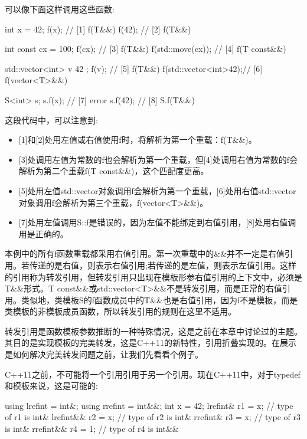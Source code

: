 可以像下面这样调用这些函数:

\begin{cpp}
int x = 42;
f(x); // [1] f(T&&)
f(42); // [2] f(T&&)

int const cx = 100;
f(cx); // [3] f(T&&)
f(std::move(cx)); // [4] f(T const&&)

std::vector<int> v{ 42 };
f(v); // [5] f(T&&)
f(std::vector<int>{42});// [6] f(vector<T>&&)

S<int> s;
s.f(x); // [7] error
s.f(42); // [8] S.f(T&&)
\end{cpp}

这段代码中，可以注意到:

\begin{itemize}
\item
{}[1]和[2]处用左值或右值使用f时，将解析为第一个重载：f(T\&\&)。

\item
{}[3]处调用左值为常数的f也会解析为第一个重载，但[4]处调用右值为常数的f会解析为第二个重载f(T const\&\&)，这个匹配度更高。

\item
{}[5]处用左值std::vector对象调用f会解析为第一个重载，[6]处用右值std::vector对象调用f会解析为第三个重载，f(vector<T>\&\&)。

\item
{}[7]处用左值调用S::f是错误的，因为左值不能绑定到右值引用，[8]处用右值调用是正确的。
\end{itemize}

本例中的所有f函数重载都采用右值引用。第一次重载中的\&\&并不一定是右值引用。若传递的是右值，则表示右值引用;若传递的是左值，则表示左值引用。这样的引用称为转发引用，但转发引用只出现在模板形参右值引用的上下文中，必须是T\&\&形式。T const\&\&或std::vector<T>\&\&不是转发引用，而是正常的右值引用。类似地，类模板S的f函数成员中的T\&\&也是右值引用，因为f不是模板，而是类模板的非模板成员函数，所以转发引用的规则在这里不适用。

转发引用是函数模板参数推断的一种特殊情况，这是之前在本章中讨论过的主题。其目的是实现模板的完美转发，这是C++11的新特性，引用折叠实现的。在展示是如何解决完美转发问题之前，让我们先看看个例子。

C++11之前，不可能将一个引用引用于另一个引用。现在C++11中，对于typedef和模板来说，这是可能的:

\begin{cpp}
using lrefint = int&;
using rrefint = int&&;
int x = 42;
lrefint& r1 = x; // type of r1 is int&
lrefint&& r2 = x; // type of r2 is int&
rrefint& r3 = x; // type of r3 is int&
rrefint&& r4 = 1; // type of r4 is int&&
\end{cpp}

